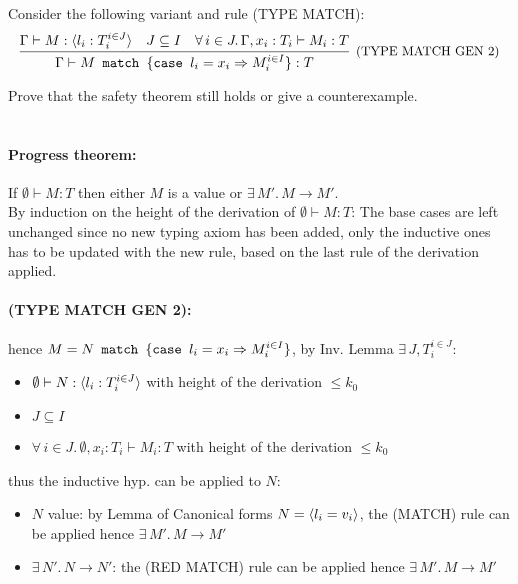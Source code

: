 \subsection{}

Consider the following variant and rule (TYPE MATCH):
\[
	\infer[\text{\small{(TYPE MATCH GEN 2)}}]
	{ \Gamma \vdash \MATCH{M}{\CASE{l_i}{x_i}{M_i^{i \in I}}}: T }
	{
	\Gamma \vdash M: \TVAR{l_i: T_i^{i \in J}} &
	J \subseteq I &
	\forall\, i \in J.\,\Gamma, x_i: T_i \vdash M_i: T
	}
\]

Prove that the safety theorem still holds or give a counterexample.\\~\\

\paragraph*{Progress theorem:\\}

If $\emptyset \vdash M: T$ then either $M$ is a value or $\exists\, M'.\, M \to M'$.\\
By induction on the height of the derivation of $\emptyset \vdash M: T$:
The base cases are left unchanged since no new typing axiom has been added, only the inductive
ones has to be updated with the new rule, based on the last rule of the derivation applied.
\paragraph*{\textmd{(TYPE MATCH GEN 2):}}
hence $M = N\texttt{ match }\{\texttt{case }l_i = x_i \Rightarrow M_i^{i \in I}\}$, by Inv. Lemma $\exists\, J, T_i^{i \in J}$:
\begin{itemize}
	\item $\emptyset \vdash N: \langle l_i: T_i^{i \in J} \rangle$ with height of the derivation $\le k_0$
	\item $J \subseteq I$
	\item $\forall\, i \in J.\, \emptyset, x_i: T_i \vdash M_i: T$ with height of the derivation $\le k_0$
\end{itemize}
thus the inductive hyp. can be applied to $N$:
\begin{itemize}
	\item $N$ value: by Lemma of Canonical forms $N = \langle l_i = v_i \rangle$, the (MATCH) rule can be applied
	      hence $\exists\, M'.\, M \to M'$
	\item $\exists\, N'.\, N \to N'$: the (RED MATCH) rule can be applied hence $\exists\, M'.\, M \to M'$
\end{itemize}

